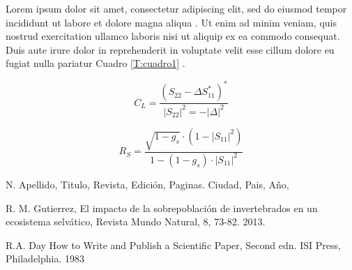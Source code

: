 \documentclass[letter,12pt]{article}
\begin{document}
Lorem ipsum dolor sit amet, consectetur adipiscing elit, sed do eiusmod tempor incididunt ut labore et dolore magna aliqua \cite{002}. Ut enim ad minim veniam, quis nostrud exercitation ullamco laboris nisi ut aliquip ex ea commodo consequat. Duis aute irure dolor in reprehenderit in voluptate velit esse cillum dolore eu fugiat nulla pariatur Cuadro \ref{T:cuadro1} . 

\begin{displaymath}
C_L=\frac{(S_{22}-\Delta S_{11}^*)^*}{|S_{22}|^2=-|\Delta|^2}
\end{displaymath}
    
\begin{displaymath}
R_S=\frac{\sqrt{1-g_s}\cdot (1-|S_{11}|^2)}{1-(1-g_s)\cdot|S_{11}|^2}
\end{displaymath}

%
%

\begin{thebibliography}{99}
 N. Apellido, Titulo, Revista, Edición, Paginas. Ciudad, Pais, Año,

 R. M. Gutierrez, El impacto de la sobrepoblación de invertebrados en un ecosistema selvático, Revista Mundo Natural, 8, 73-82. 2013.

 R.A. Day How to Write and Publish a Scientific Paper, Second edn. ISI Press, Philadelphia. 1983

\end{thebibliography}  
\end{document}
